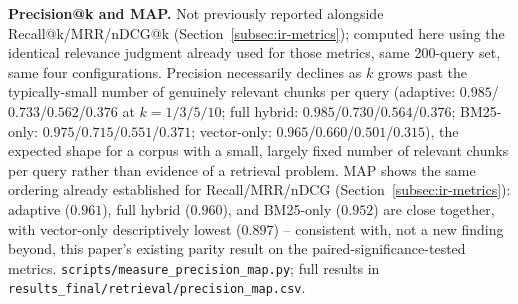 \documentclass[a4paper,twoside]{article}
\begin{document}
\textbf{Precision@k and MAP.} Not previously reported alongside Recall@k/MRR/nDCG@k (Section~\ref{subsec:ir-metrics}); computed here using the identical relevance judgment already used for those metrics, same 200-query set, same four configurations. Precision necessarily declines as $k$ grows past the typically-small number of genuinely relevant chunks per query (adaptive: $0.985$/$0.733$/$0.562$/$0.376$ at $k=1/3/5/10$; full hybrid: $0.985$/$0.730$/$0.564$/$0.376$; BM25-only: $0.975$/$0.715$/$0.551$/$0.371$; vector-only: $0.965$/$0.660$/$0.501$/$0.315$), the expected shape for a corpus with a small, largely fixed number of relevant chunks per query rather than evidence of a retrieval problem. MAP shows the same ordering already established for Recall/MRR/nDCG (Section~\ref{subsec:ir-metrics}): adaptive ($0.961$), full hybrid ($0.960$), and BM25-only ($0.952$) are close together, with vector-only descriptively lowest ($0.897$) -- consistent with, not a new finding beyond, this paper's existing parity result on the paired-significance-tested metrics. \texttt{scripts/measure\_precision\_map.py}; full results in \texttt{results\_final/retrieval/precision\_map.csv}.
\end{document}

